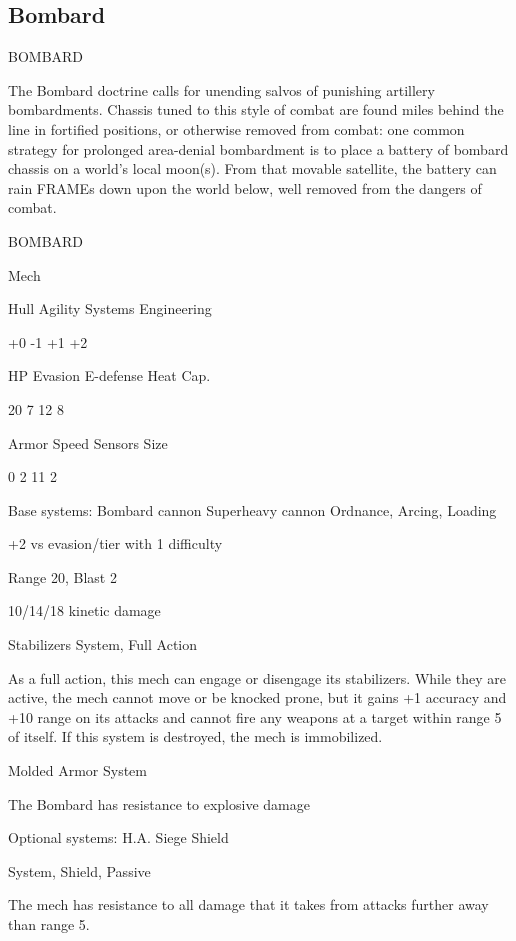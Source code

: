 \subsection{Bombard}

                                             BOMBARD

The Bombard doctrine calls for unending salvos of punishing artillery bombardments. Chassis
tuned to this style of combat are found miles behind the line in fortified positions, or otherwise
removed from combat: one common strategy for prolonged area-denial bombardment is to place
a battery of bombard chassis on a world's local moon(s). From that movable satellite, the battery
can rain FRAMEs down upon the world below, well removed from the dangers of combat.


       BOMBARD

       Mech

       Hull      Agility     Systems       Engineering

       +0        -1          +1            +2

       HP        Evasion     E-defense     Heat Cap.

       20        7            12           8

      Armor      Speed       Sensors       Size

       0         2            11           2

Base systems:
Bombard cannon
Superheavy cannon
Ordnance, Arcing, Loading

+2 vs evasion/tier with 1 difficulty

Range 20, Blast 2

10/14/18 kinetic damage


Stabilizers
System, Full Action

As a full action, this mech can engage or disengage its stabilizers. While they are active, the
mech cannot move or be knocked prone, but it gains +1 accuracy and +10 range on its attacks
and cannot fire any weapons at a target within range 5 of itself. If this system is destroyed, the
mech is immobilized.


Molded Armor
System

The Bombard has resistance to explosive damage


Optional systems:
H.A. Siege Shield




System, Shield, Passive

The mech has resistance to all damage that it takes from attacks further away than range 5.


